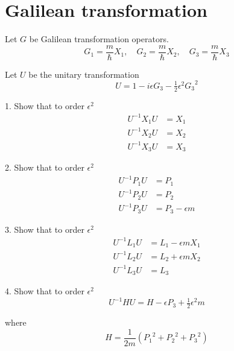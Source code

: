 

\section*{Galilean transformation}

Let $G$ be Galilean transformation operators.
\begin{equation*}
G_1=\frac{m}{\hbar}X_1,\quad G_2=\frac{m}{\hbar}X_2,\quad G_3=\frac{m}{\hbar}X_3
\end{equation*}

Let $U$ be the unitary transformation
\begin{equation*}
U=1-i\epsilon G_3-\tfrac{1}{2}\epsilon^2{G_3}^2
\end{equation*}

1. Show that to order $\epsilon^2$
\begin{align*}
U^{-1}X_1U&=X_1
\\
U^{-1}X_2U&=X_2
\\
U^{-1}X_3U&=X_3
\end{align*}

2. Show that to order $\epsilon^2$
\begin{align*}
U^{-1}P_1U&=P_1
\\
U^{-1}P_2U&=P_2
\\
U^{-1}P_3U&=P_3-\epsilon m
\end{align*}

3. Show that to order $\epsilon^2$
\begin{align*}
U^{-1}L_1U&=L_1-\epsilon mX_1
\\
U^{-1}L_2U&=L_2+\epsilon mX_2
\\
U^{-1}L_3U&=L_3
\end{align*}

4. Show that to order $\epsilon^2$
\begin{equation*}
U^{-1}HU=H-\epsilon P_3+\tfrac{1}{2}\epsilon^2m
\end{equation*}

where
\begin{equation*}
H=\frac{1}{2m}\left({P_1}^2+{P_2}^2+{P_3}^2\right)
\end{equation*}


